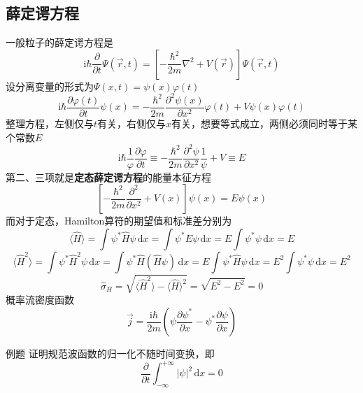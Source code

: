 \subsection{薛定谔方程}
一般粒子的薛定谔方程是
$$
    \mathrm{i}\hbar\frac{\partial }{\partial t}\Psi(\vec{r}, t) = \left[-\frac{\hbar^2}{2m}\nabla^2 + V(\vec{r})\right]\Psi(\vec{r}, t)
$$
设分离变量的形式为$\Psi(x,t)=\psi(x)\varphi(t)$
$$
    \mathrm{i}\hbar\frac{\partial \varphi(t)}{\partial t}\psi(x) = -\frac{\hbar^2}{2m}\frac{\partial^2 \psi(x)}{\partial x^2}\varphi(t) + V\psi(x)\varphi(t)
$$
整理方程，左侧仅与$t$有关，右侧仅与$x$有关，想要等式成立，两侧必须同时等于某个常数$E$
$$
    \mathrm{i}\hbar\frac{1}{\varphi}\frac{\partial \varphi}{\partial t} \equiv -\frac{\hbar^2}{2m}\frac{\partial^2 \psi}{\partial x^2}\frac{1}{\psi} + V \equiv E
$$
第二、三项就是\textbf{定态薛定谔方程}的能量本征方程
$$
    \left[-\frac{\hbar^2}{2m}\frac{\partial^2}{\partial x^2} + V(x)\right]\psi(x) = E\psi(x)
$$
而对于定态，Hamilton算符的期望值和标准差分别为
$$
    \langle\hat{H}\rangle=\int\psi^*\hat{H}\psi\,\mathrm{d}x=\int\psi^*E\psi\,\mathrm{d}x=E\int\psi^*\psi\,\mathrm{d}x=E
$$
$$
    \langle\hat{H}^2\rangle
    =\int\psi^*\hat{H}^2\psi\,\mathrm{d}x
    =\int\psi^*\hat{H}(\hat{H}\psi)\,\mathrm{d}x
    =E\int\psi^*\hat{H}\psi\,\mathrm{d}x
    =E^2\int\psi^*\psi\,\mathrm{d}x
    =E^2
$$
$$
    \hat{\sigma}_{H}
    =\sqrt{\langle\hat{H}^2\rangle-\langle\hat{H}\rangle^2}
    =\sqrt{E^2-E^2}
    =0
$$
概率流密度函数
$$
    \vec{j}=\frac{\mathrm{i}\hbar}{2m}\left(\psi\frac{\partial \psi^*}{\partial x}-\psi^*\frac{\partial \psi}{\partial x}\right)
$$
\begin{question}{例题}
    证明规范波函数的归一化不随时间变换，即
    $$
        \frac{\partial }{\partial t}\int_{-\infty}^{+\infty}|\psi|^2 \,\mathrm{d}x=0
    $$
\end{question}
